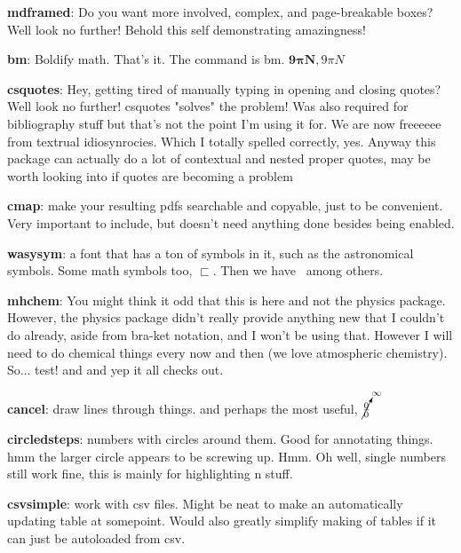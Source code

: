 \documentclass{article}
\begin{document}

\begin{infobox}[backgroundcolor=yellow]
\textbf{mdframed}:  Do you want more involved, complex, and page-breakable boxes? Well look no further! Behold this self demonstrating amazingness!
\end{infobox}

\textbf{bm}: Boldify math. That's it. The command is bm. $\bm{9\pi N}, 9\pi N$

\textbf{csquotes}: Hey, getting tired of manually typing in opening and closing quotes? Well look no further! csquotes "solves" the problem! Was also required for bibliography stuff but that's not the point I'm using it for. We are now freeeeee from textrual idiosynrocies. Which I totally spelled correctly, yes. Anyway this package can actually do a lot of contextual and nested proper quotes, may be worth looking into if quotes are becoming a problem

\textbf{cmap}: make your resulting pdfs searchable and copyable, just to be convenient. Very important to include, but doesn't need anything done besides being enabled.

\textbf{wasysym}: a font that has a ton of symbols in it, such as the astronomical symbols. Some math symbols too, $\sqsubset$. Then we have \sun \bell \smiley \clock \AC \photon \gluon \eighthnote \thorn \virgo \saturn\ among others.

\textbf{mhchem}: You might think it odd that this is here and not the physics package. However, the physics package didn't really provide anything new that I couldn't do already, aside from bra-ket notation, and I won't be using that. However I will need to do chemical things every now and then (we love atmospheric chemistry). So... test!  and  and  yep it all checks out.

\textbf{cancel}: draw lines through things.     and perhaps the most useful, $\cancelto{\infty}{\frac{0}{0}}$

\textbf{circledsteps}: numbers with circles around them. Good for annotating things.   hmm the larger circle appears to be screwing up. Hmm. Oh well, single numbers still work fine, this is mainly for highlighting n stuff.

\textbf{csvsimple}: work with csv files. Might be neat to make an automatically updating table at somepoint. Would also greatly simplify making of tables if it can just be autoloaded from csv. 
\end{document}
